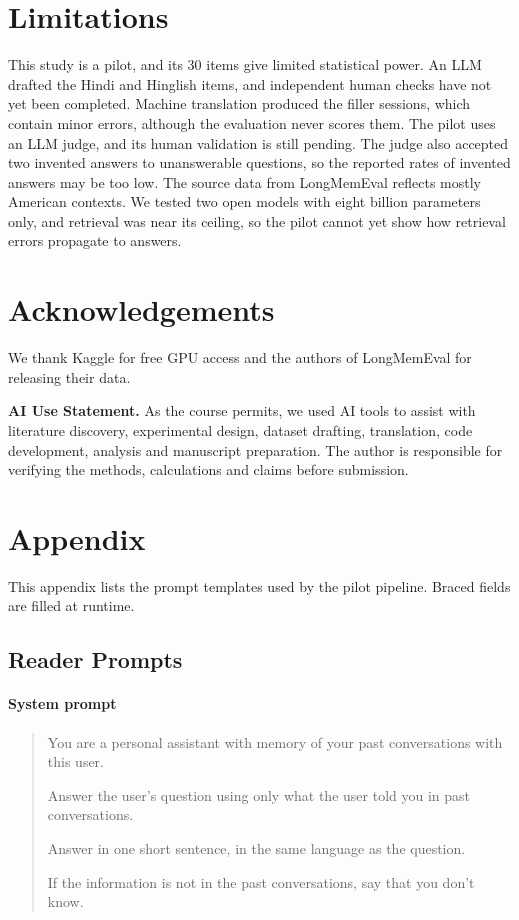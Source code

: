 \documentclass[11pt]{article}
\begin{document}
\section*{Limitations}
This study is a pilot, and its 30 items give limited statistical power.
An LLM drafted the Hindi and Hinglish items, and independent human checks have not yet been completed.
Machine translation produced the filler sessions, which contain minor errors, although the evaluation never scores them.
The pilot uses an LLM judge, and its human validation is still pending.
The judge also accepted two invented answers to unanswerable questions, so the reported rates of invented answers may be too low.
The source data from LongMemEval reflects mostly American contexts.
We tested two open models with eight billion parameters only, and retrieval was near its ceiling, so the pilot cannot yet show how retrieval errors propagate to answers.

\section*{Acknowledgements}
We thank Kaggle for free GPU access and the authors of LongMemEval for releasing their data.

\noindent\textbf{AI Use Statement.}
As the course permits, we used AI tools to assist with literature discovery, experimental design, dataset drafting, translation, code development, analysis and manuscript preparation.
The author is responsible for verifying the methods, calculations and claims before submission.



\clearpage
\onecolumn
\appendix

\section*{Appendix}
\label{app:prompts}
This appendix lists the prompt templates used by the pilot pipeline. Braced fields are filled at runtime.

\subsection*{Reader Prompts}
\paragraph*{System prompt}
\begin{quote}\footnotesize\ttfamily
You are a personal assistant with memory of your past conversations with this user.\par
Answer the user's question using only what the user told you in past conversations.\par
Answer in one short sentence, in the same language as the question.\par
If the information is not in the past conversations, say that you don't know.
\end{quote}
\end{document}
